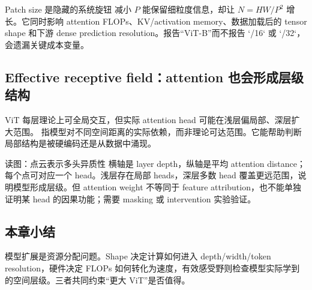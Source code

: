 \begin{warningbox}{Patch size 是隐藏的系统旋钮}
减小 $P$ 能保留细粒度信息，却让 $N=HW/P^2$ 增长。它同时影响 attention FLOPs、KV/activation memory、数据加载后的 tensor shape 和下游 dense prediction resolution。报告“ViT-B”而不报告 `/16` 或 `/32`，会遗漏关键成本变量。
\end{warningbox}

\subsection{Effective receptive field：attention 也会形成层级结构}

ViT 每层理论上可全局交互，但实际 attention head 可能在浅层偏局部、深层扩大范围。 指模型对不同空间距离的实际依赖，而非理论可达范围。它能帮助判断局部结构是被硬编码还是从数据中涌现。


\begin{knowledgebox}{读图：点云表示多头异质性}
横轴是 layer depth，纵轴是平均 attention distance；每个点可对应一个 head。浅层存在局部 heads，深层多数 head 覆盖更远范围，说明模型形成层级。但 attention weight 不等同于 feature attribution，也不能单独证明某 head 的因果功能；需要 masking 或 intervention 实验验证。
\end{knowledgebox}


\subsection{本章小结}

模型扩展是资源分配问题。Shape 决定计算如何进入 depth/width/token resolution，硬件决定 FLOPs 如何转化为速度，有效感受野则检查模型实际学到的空间层级。三者共同约束“更大 ViT”是否值得。

